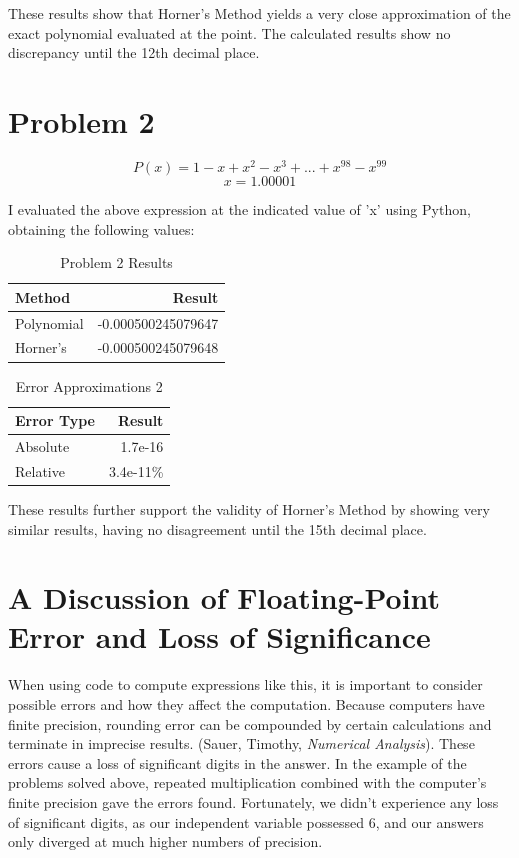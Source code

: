 \documentclass{article}
\begin{document}
These results show that Horner's Method yields a very close approximation of the exact
polynomial evaluated at the point. The calculated results show no discrepancy until the 
12th decimal place. 

\section{Problem 2}
$$ P(x) = 1 - x + x^2 - x^3 + ... + x^{98} - x^{99} $$
$$ x = 1.00001 $$

I evaluated the above expression at the indicated value of 'x' using Python, obtaining
the following values:

\begin{table}[H]
\centering
\begin{tabular}{|l|r|}
\hline
Method & Result \\ \hline
Polynomial & -0.000500245079647 \\ \hline
Horner's & -0.000500245079648 \\ \hline
\end{tabular}
\caption{Problem 2 Results}
\label{tab:problem_2_results}
\end{table}

\begin{table}[H]
\centering
\begin{tabular}{|l|r|}
\hline
Error Type & Result \\ \hline
Absolute & 1.7e-16 \\ \hline
Relative & 3.4e-11\% \\ \hline
\end{tabular}
\caption{Error Approximations 2}
\label{tab:error_approximations_2}
\end{table}

These results further support the validity of Horner's Method by showing very similar 
results, having no disagreement until the 15th decimal place.

\section{A Discussion of Floating-Point Error and Loss of Significance}

When using code to compute expressions like this, it is important to consider possible 
errors and how they affect the computation. Because computers have finite precision, 
rounding error can be compounded by certain calculations and terminate in imprecise results.
(Sauer, Timothy, \textit{Numerical Analysis}). These errors cause a loss of significant 
digits in the answer. In the example of the problems solved above, repeated multiplication
combined with the computer's finite precision gave the errors found. Fortunately, we didn't 
experience any loss of significant digits, as our independent variable possessed 6, and our 
answers only diverged at much higher numbers of precision. 
\end{document}
